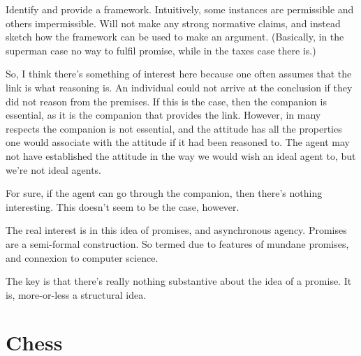 \documentclass[10pt]{article}
\begin{document}
\begin{note}
  Identify and provide a framework.
  Intuitively, some instances are permissible and others impermissible.
  Will not make any strong normative claims, and instead sketch how the framework can be used to make an argument.
  (Basically, in the superman case no way to fulfil promise, while in the taxes case there is.)
\end{note}


So, I think there's something of interest here because one often assumes that the link is what reasoning is.
An individual could not arrive at the conclusion if they did not reason from the premises.
If this is the case, then the companion is essential, as it is the companion that provides the link.
However, in many respects the companion is not essential, and the attitude has all the properties one would associate with the attitude if it had been reasoned to.
The agent may not have established the attitude in the way we would wish an ideal agent to, but we're not ideal agents.

For sure, if the agent can go through the companion, then there's nothing interesting.
This doesn't seem to be the case, however.

The real interest is in this idea of promises, and asynchronous agency.
Promises are a semi-formal construction.
So termed due to features of mundane promises, and connexion to computer science.

The key is that there's really nothing substantive about the idea of a promise.
It is, more-or-less a structural idea.



\section{Chess}
\label{sec:chess}
\end{document}
